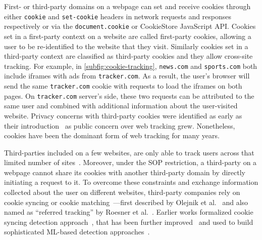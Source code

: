 First- or third-party domains on a webpage can set and receive cookies through either \texttt{cookie} and \texttt{set-cookie} headers in network requests and responses respectively or via the \texttt{document.cookie} or CookieStore JavaScript API.
%
Cookies set in a first-party context on a website are called first-party cookies, allowing a user to be re-identified to the website that they visit. 
%
Similarly cookies set in a third-party context are classified as third-party cookies and they allow cross-site tracking. 
%
For example, in \autoref{subfig:cookie-tracking}, \texttt{news.com} and \texttt{sports.com} both include iframes with ads from \texttt{tracker.com}. 
%
As a result, the user’s browser will send the same \texttt{tracker.com} cookie with requests to load the iframes on both pages. 
%
On \texttt{tracker.com} server's side, these two requests can be attributed to the same user and combined with additional information about the user-visited website. 
%
Privacy concerns with third-party cookies were identified as early as their introduction~\cite{montulliHTTPStateManagement1997,kristolHTTPCookiesStandards2001} as public concern over web tracking grew.
Nonetheless, cookies have been the dominant form of web tracking for many years. 


Third-parties included on a few websites, are only able to track users across that limited number of sites~\cite{roesnerDetectingDefendingThirdparty2012,lernerInternetJonesRaiders2016}. 
%
Moreover, under the SOP restriction, a third-party on a webpage cannot share its cookies with another third-party domain by directly initiating a request to it.
%
To overcome these constraints and exchange information collected about the user on different websites, third-party companies rely on cookie syncing or cookie matching~\cite{acarWebNeverForgets2014}---first described by Olejnik et al.~\cite{olejnikSellingPrivacyAuction2014} and also named as ``referred tracking'' by Roesner et al.~\cite{roesnerDetectingDefendingThirdparty2012}. 
%
Earlier works formalized cookie syncing detection approach~\cite{acarWebNeverForgets2014,englehardtOnlineTracking1millionsite2016,bashirTracingInformationFlows2016}, that has been further improved~\cite{papadopoulosCookieSynchronizationEverything2019} and used to build sophisticated ML-based detection approaches~\cite{papadopoulosCookieSynchronizationEverything2019, iqbalKhaleesiBreakerAdvertising2022}.

